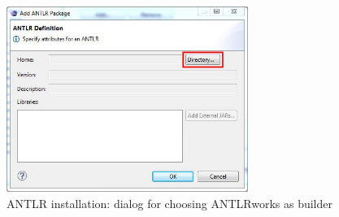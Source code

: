 \begin{figure}[!htbp]
\begin{center}
 \includegraphics[width=0.7\textwidth]{pics/moca/0Install/2-choose-path-to-jar}
  \caption{ANTLR installation: dialog for choosing ANTLRworks as builder}
  \label{moca-2-choose-path-to-jar}
\end{center}
\end{figure}


